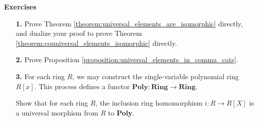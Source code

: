     {\large \textbf{Exercises}
    \vspace{0.5cm}}
    \def\exerciseCartesianProduct{4} %
    \begin{itemize}
        \item[\textbf{1.}]
        Prove Theorem \ref{theorem:universal_elements_are_isomorphic} directly,
        and dualize your proof to prove Theorem \ref{theorem:couniversal_elements_isomorphic}
        directly. 

        \item[\textbf{2.}]
        Prove Proposition \ref{proposition:universal_elements_in_comma_cats}.

        \item[\textbf{3.}]
        For each ring $R$, we may construct the single-variable 
        polynomial ring $R[x]$. This process defines a functor
        $\textbf{Poly}: \textbf{Ring} \to \textbf{Ring}$.

        Show that for each ring $R$, the inclusion ring homomorphism $i: R \to R[X]$ 
        is a universal morphism from $R$ to \textbf{Poly}. 



\end{itemize}
